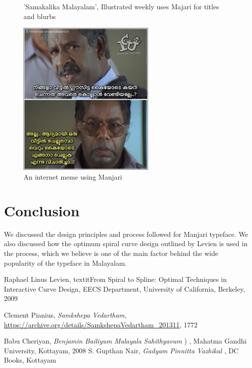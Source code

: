 \documentclass[11pt,twoside,a4paper,parskip=half]{scrartcl}
\begin{document}
\begin{figure}[h!]
\begin{subfigure}[b]{.45\textwidth}
	\end{subfigure}

	\caption{'Samakalika Malayalam', Illustrated weekly uses Majari for titles and blurbs}
	\label{manjari-sample-3}
\end{figure}

\begin{figure}[h!]
	\includegraphics[width=0.6\textwidth]{images/manjari-sample-4.png}
	\caption{An internet meme using Manjari}
	\label{manjari-sample-4}
\end{figure}

\clearpage
\section{Conclusion}

We discussed the design principles and process followed for Manjari typeface. We also discussed how the optimum spiral curve design outlined by Levien is used in the process, which we believe is one of the main factor behind the wide popularity of the typeface in Malayalam.


\begin{thebibliography}{11}

  Raphael Linus Levien,
  textit{From Spiral to Spline: Optimal Techniques in Interactive Curve Design},
  EECS Department, University of California, Berkeley,
  2009

 Clement Pianius,
 \emph{Samkshepa Vedartham},
 \url{https://archive.org/details/SamkshepaVedartham_201311},
 1772

 Babu Cheriyan, \textit{Benjamin Bailiyum Malayala Sahithyavum} {) }, Mahatma Gandhi University, Kottayam, 2008
	 S. Gupthan Nair, \textit{Gadyam Pinnitta Vazhikal}{ }, DC Books, Kottayam 

	
\end{thebibliography}
\end{document}
